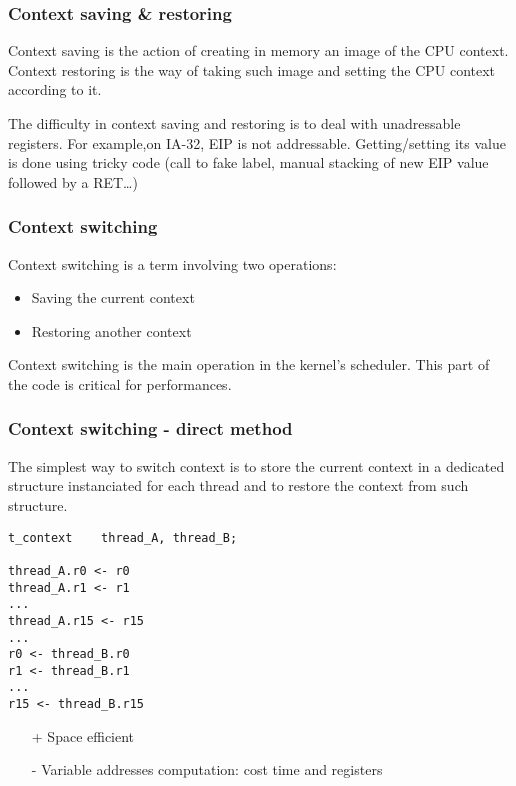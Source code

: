 
\begin{frame}
  \frametitle{Context saving \& restoring}

  Context saving is the action of creating in memory an image of the
  CPU context. Context restoring is the way of taking such image and
  setting the CPU context according to it.

  \-

  The difficulty in context saving and restoring is to deal with
  unadressable registers. For example,on IA-32, EIP is not
  addressable. Getting/setting its value is done using tricky code
  (call to fake label, manual stacking of new EIP value followed by a
  RET\ldots)

\end{frame}


\begin{frame}
  \frametitle{Context switching}

  Context switching is a term involving two operations:

  \begin{itemize}
  \item
    Saving the current context
  \item
    Restoring another context
  \end{itemize}

  \-

  Context switching is the main operation in the kernel's
  scheduler. This part of the code is critical for performances.

  \begin{center}
  \end{center}

\end{frame}


\begin{frame}[containsverbatim]
  \frametitle{Context switching - direct method}

  The simplest way to switch context is to store the current context
  in a dedicated structure instanciated for each thread and to restore
  the context from such structure.

  \begin{verbatim}
t_context    thread_A, thread_B;

thread_A.r0 <- r0
thread_A.r1 <- r1
...
thread_A.r15 <- r15
...
r0 <- thread_B.r0
r1 <- thread_B.r1
...
r15 <- thread_B.r15
  \end{verbatim}

  \begin{itemize}
  \item[+]
    Space efficient
  \item[-]
    Variable addresses computation: cost time and registers
  \end{itemize}

\end{frame}

